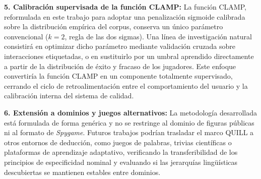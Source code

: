 \documentclass[../main.tex]{subfiles}
\begin{document}
\textbf{5. Calibración supervisada de la función CLAMP:}
La función CLAMP, reformulada en este trabajo para adoptar una penalización sigmoide calibrada sobre la distribución empírica del corpus, conserva un único parámetro convencional ($k=2$, regla de las dos sigmas). Una línea de investigación natural consistirá en optimizar dicho parámetro mediante validación cruzada sobre interacciones etiquetadas, o en sustituirlo por un umbral aprendido directamente a partir de la distribución de éxito y fracaso de los jugadores. Este enfoque convertiría la función CLAMP en un componente totalmente supervisado, cerrando el ciclo de retroalimentación entre el comportamiento del usuario y la calibración interna del sistema de calidad.

\textbf{6. Extensión a dominios y juegos alternativos:}
La metodología desarrollada está formulada de forma genérica y no se restringe al dominio de figuras públicas ni al formato de \textit{Spygame}. Futuros trabajos podrían trasladar el marco QUILL a otros entornos de deducción, como juegos de palabras, trivias científicas o plataformas de aprendizaje adaptativo, verificando la transferibilidad de los principios de especificidad nominal y evaluando si las jerarquías lingüísticas descubiertas se mantienen estables entre dominios.
\end{document}
